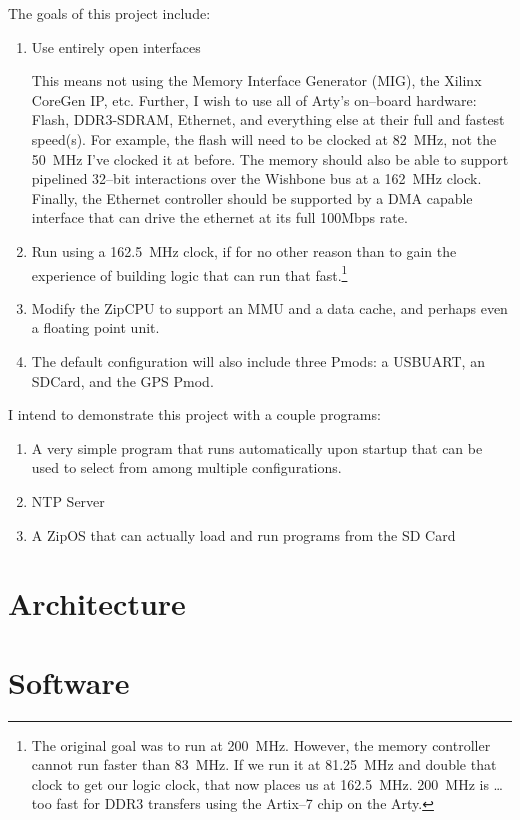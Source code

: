 \documentclass{gqtekspec}
\begin{document}
The goals of this project include:
\begin{enumerate}
\item Use entirely open interfaces

	This means not using the Memory Interface Generator (MIG), the
	Xilinx CoreGen IP, etc.  Further, I wish to use all of Arty's on--board
	hardware: Flash, DDR3-SDRAM, Ethernet, and everything else at their
	full and fastest speed(s).  For example, the flash will need to be
	clocked at 82~MHz, not the 50~MHz I've clocked it at before.  The
	memory should also be able to support pipelined 32--bit interactions
	over the Wishbone bus at a 162~MHz clock.  Finally, the Ethernet
	controller should be supported by a DMA capable interface that can
	drive the ethernet at its full 100Mbps rate.

\item Run using a 162.5~MHz clock, if for no other reason than to gain the
	experience of building logic that can run that fast.\footnote{The
	original goal was to run at 200~MHz.  However, the memory controller
	cannot run faster than 83~MHz.  If we run it at 81.25~MHz and double
	that clock to get our logic clock, that now places us at 162.5~MHz.
	200~MHz is \ldots too fast for DDR3 transfers using the Artix--7 chip
	on the Arty.}

\item Modify the ZipCPU to support an MMU and a data cache, and perhaps even
	a floating point unit.

\item The default configuration will also include three Pmods: a USBUART,
	an SDCard, and the GPS Pmod.
\end{enumerate}

I intend to demonstrate this project with a couple programs:
\begin{enumerate}
\item A very simple program that runs automatically upon startup that can be
	used to select from among multiple configurations.
\item NTP Server
\item A ZipOS that can actually load and run programs from the SD Card
\end{enumerate}

\chapter{Architecture}


\chapter{Software}
\end{document}
